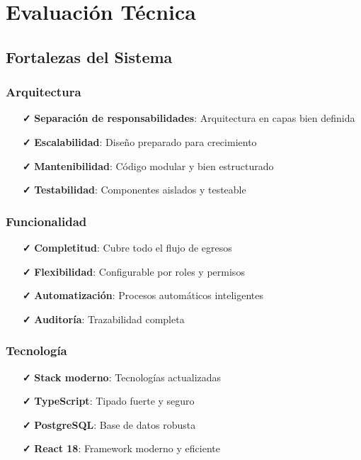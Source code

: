 \documentclass[12pt,a4paper]{article}
\newcommand{\success}[1]{\textcolor{secondarygreen}{\textbf{#1}}}
\begin{document}

\section{Evaluación Técnica}

\subsection{Fortalezas del Sistema}

\subsubsection{Arquitectura}
\begin{itemize}[leftmargin=*]
    \item[\success{✓}] \textbf{Separación de responsabilidades}: Arquitectura en capas bien definida
    \item[\success{✓}] \textbf{Escalabilidad}: Diseño preparado para crecimiento
    \item[\success{✓}] \textbf{Mantenibilidad}: Código modular y bien estructurado
    \item[\success{✓}] \textbf{Testabilidad}: Componentes aislados y testeable
\end{itemize}

\subsubsection{Funcionalidad}
\begin{itemize}[leftmargin=*]
    \item[\success{✓}] \textbf{Completitud}: Cubre todo el flujo de egresos
    \item[\success{✓}] \textbf{Flexibilidad}: Configurable por roles y permisos
    \item[\success{✓}] \textbf{Automatización}: Procesos automáticos inteligentes
    \item[\success{✓}] \textbf{Auditoría}: Trazabilidad completa
\end{itemize}

\subsubsection{Tecnología}
\begin{itemize}[leftmargin=*]
    \item[\success{✓}] \textbf{Stack moderno}: Tecnologías actualizadas
    \item[\success{✓}] \textbf{TypeScript}: Tipado fuerte y seguro
    \item[\success{✓}] \textbf{PostgreSQL}: Base de datos robusta
    \item[\success{✓}] \textbf{React 18}: Framework moderno y eficiente
\end{itemize}
\end{document}
